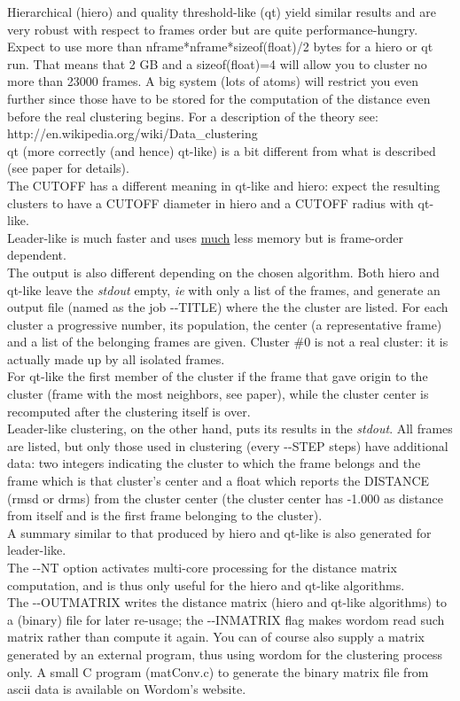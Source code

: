\documentclass[11pt,twoside,onecolumn,a4paper,openright,notitlepage]{book}[2001/04/21]
\begin{document}
Hierarchical (hiero) and quality threshold-like (qt) yield similar results and are very robust with respect to frames order but are quite performance-hungry. Expect to use more than nframe*nframe*sizeof(float)/2 bytes for a hiero or qt run. That means that 2 GB and a sizeof(float)=4 will allow you to cluster no more than 23000 frames. A big system (lots of atoms) will restrict you even further since those have to be stored for the computation of the distance even before the real clustering begins. For a description of the theory see:\\
http://en.wikipedia.org/wiki/Data\_clustering\\
qt (more correctly (and hence) qt-like) is a bit different from what is described (see paper for details).\\
The CUTOFF has a different meaning in qt-like and hiero: expect the resulting clusters to have a CUTOFF diameter in hiero and a CUTOFF radius with qt-like.\\
Leader-like is much faster and uses \underline{much} less memory but is frame-order dependent.\\
The output is also different depending on the chosen algorithm. Both hiero and qt-like leave the \emph{stdout} empty, \emph{ie} with only a list of the frames, and generate an output file (named as the job -{}-TITLE) where the the cluster are listed. For each cluster a progressive number, its population, the center (a representative frame) and a list of the belonging frames are given. Cluster \#0 is not a real cluster: it is actually made up by all isolated frames.\\
For qt-like the first member of the cluster if the frame that gave origin to the cluster (frame with the most neighbors, see paper), while the cluster center is recomputed after the clustering itself is over.\\
Leader-like clustering, on the other hand, puts its results in the \emph{stdout}. All frames are listed, but only those used in clustering (every -{}-STEP steps) have additional data: two integers indicating the cluster to which the frame belongs and the frame which is that cluster's center and a float which reports the DISTANCE (rmsd or drms) from the cluster center (the cluster center has -1.000 as distance from itself and is the first frame belonging to the cluster).\\
A summary similar to that produced by hiero and qt-like is also generated for leader-like.\\
The -{}-NT option activates multi-core processing for the distance matrix computation, and is thus only useful for the hiero and qt-like algorithms.\\
The -{}-OUTMATRIX writes the distance matrix (hiero and qt-like algorithms) to a (binary) file for later re-usage; the -{}-INMATRIX flag makes wordom read such matrix rather than compute it again. You can of course also supply a matrix generated by an external program, thus using wordom for the clustering process only. A small C program (matConv.c) to generate the binary matrix file from ascii data is available on Wordom's website.\\
\end{document}
